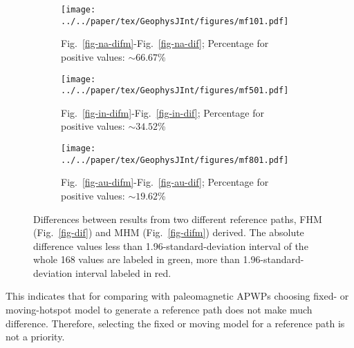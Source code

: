 \begin{figure*}
	\centering
	\begin{subfigure}{1.01\textwidth}
		\texttt{[image: ../../paper/tex/GeophysJInt/figures/mf101.pdf]}
		\caption{Fig.~\ref{fig-na-difm}-Fig.~\ref{fig-na-dif}; Percentage for
		positive values: ${\sim}66.67$\%}\label{fig-mf101}
	\end{subfigure}
	\vspace{.1em}
	\begin{subfigure}{1.01\textwidth}
		\texttt{[image: ../../paper/tex/GeophysJInt/figures/mf501.pdf]}
		\caption{Fig.~\ref{fig-in-difm}-Fig.~\ref{fig-in-dif}; Percentage for
		positive values: ${\sim}34.52$\%}\label{fig-mf501}
	\end{subfigure}
	\vspace{.1em}
	\begin{subfigure}{1.01\textwidth}
		\texttt{[image: ../../paper/tex/GeophysJInt/figures/mf801.pdf]}
		\caption{Fig.~\ref{fig-au-difm}-Fig.~\ref{fig-au-dif}; Percentage for
		positive values: ${\sim}19.62$\%}\label{fig-mf801}
	\end{subfigure}
	\caption[Differences between results from FHM and MHM]{Differences between
results from two different reference paths, FHM (Fig.~\ref{fig-dif}) and MHM
(Fig.~\ref{fig-difm}) derived. The absolute difference values less than
1.96-standard-deviation interval of the whole 168 values are labeled in green,
more than 1.96-standard-deviation interval labeled in red.}\label{fig-dmf}
\end{figure*}

This indicates that for comparing with paleomagnetic APWPs choosing fixed- or
moving-hotspot model to generate a reference path does not make much difference.
Therefore, selecting the fixed or moving model for a reference path is not a
priority.

